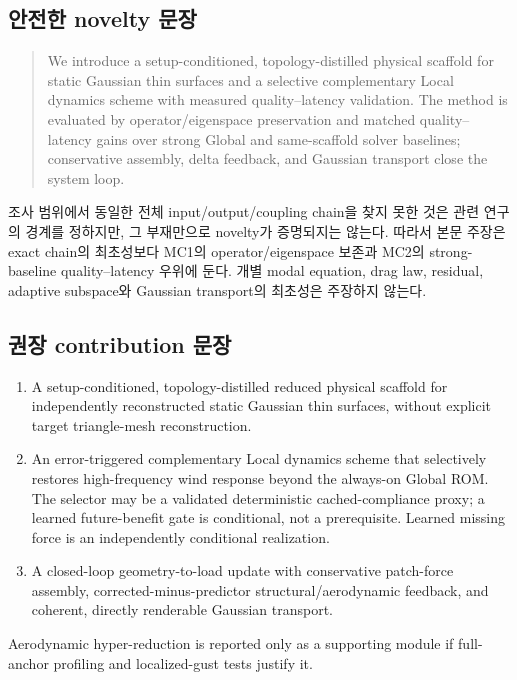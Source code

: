 \documentclass[11pt,a4paper]{article}
\begin{document}
\subsection{안전한 novelty 문장}

\begin{quote}
We introduce a setup-conditioned, topology-distilled physical scaffold for static
Gaussian thin surfaces and a selective complementary Local dynamics scheme with measured quality--latency validation.
The method is evaluated by operator/eigenspace preservation and matched
quality--latency gains over strong Global and same-scaffold solver baselines;
conservative assembly, delta feedback, and Gaussian transport close the system loop.
\end{quote}

조사 범위에서 동일한 전체 input/output/coupling chain을 찾지 못한 것은 관련 연구의 경계를 정하지만,
그 부재만으로 novelty가 증명되지는 않는다.
따라서 본문 주장은 exact chain의 최초성보다 MC1의 operator/eigenspace 보존과
MC2의 strong-baseline quality--latency 우위에 둔다.
개별 modal equation, drag law, residual, adaptive subspace와 Gaussian transport의 최초성은 주장하지 않는다.

\subsection{권장 contribution 문장}

\begin{enumerate}[leftmargin=1.7em]
  \item A setup-conditioned, topology-distilled reduced physical scaffold for
  independently reconstructed static Gaussian thin surfaces, without explicit
  target triangle-mesh reconstruction.
  \item An error-triggered complementary Local dynamics scheme that selectively
  restores high-frequency wind response beyond the always-on Global ROM.
  The selector may be a validated deterministic cached-compliance proxy;
  a learned future-benefit gate is conditional, not a prerequisite.
  Learned missing force is an independently conditional realization.
  \item A closed-loop geometry-to-load update with conservative patch-force assembly,
  corrected-minus-predictor structural/aerodynamic feedback, and coherent,
  directly renderable Gaussian transport.
\end{enumerate}

Aerodynamic hyper-reduction is reported only as a supporting module if full-anchor
profiling and localized-gust tests justify it.
\end{document}
